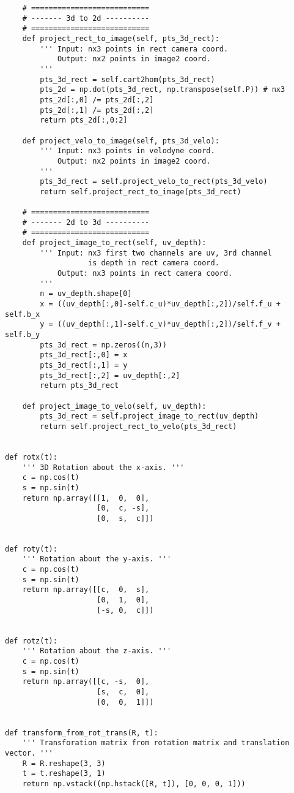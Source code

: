 \begin{verbatim}
    # =========================== 
    # ------- 3d to 2d ---------- 
    # =========================== 
    def project_rect_to_image(self, pts_3d_rect):
        ''' Input: nx3 points in rect camera coord.
            Output: nx2 points in image2 coord.
        '''
        pts_3d_rect = self.cart2hom(pts_3d_rect)
        pts_2d = np.dot(pts_3d_rect, np.transpose(self.P)) # nx3
        pts_2d[:,0] /= pts_2d[:,2]
        pts_2d[:,1] /= pts_2d[:,2]
        return pts_2d[:,0:2]
    
    def project_velo_to_image(self, pts_3d_velo):
        ''' Input: nx3 points in velodyne coord.
            Output: nx2 points in image2 coord.
        '''
        pts_3d_rect = self.project_velo_to_rect(pts_3d_velo)
        return self.project_rect_to_image(pts_3d_rect)

    # =========================== 
    # ------- 2d to 3d ---------- 
    # =========================== 
    def project_image_to_rect(self, uv_depth):
        ''' Input: nx3 first two channels are uv, 3rd channel
                   is depth in rect camera coord.
            Output: nx3 points in rect camera coord.
        '''
        n = uv_depth.shape[0]
        x = ((uv_depth[:,0]-self.c_u)*uv_depth[:,2])/self.f_u + self.b_x
        y = ((uv_depth[:,1]-self.c_v)*uv_depth[:,2])/self.f_v + self.b_y
        pts_3d_rect = np.zeros((n,3))
        pts_3d_rect[:,0] = x
        pts_3d_rect[:,1] = y
        pts_3d_rect[:,2] = uv_depth[:,2]
        return pts_3d_rect

    def project_image_to_velo(self, uv_depth):
        pts_3d_rect = self.project_image_to_rect(uv_depth)
        return self.project_rect_to_velo(pts_3d_rect)

 
def rotx(t):
    ''' 3D Rotation about the x-axis. '''
    c = np.cos(t)
    s = np.sin(t)
    return np.array([[1,  0,  0],
                     [0,  c, -s],
                     [0,  s,  c]])


def roty(t):
    ''' Rotation about the y-axis. '''
    c = np.cos(t)
    s = np.sin(t)
    return np.array([[c,  0,  s],
                     [0,  1,  0],
                     [-s, 0,  c]])


def rotz(t):
    ''' Rotation about the z-axis. '''
    c = np.cos(t)
    s = np.sin(t)
    return np.array([[c, -s,  0],
                     [s,  c,  0],
                     [0,  0,  1]])


def transform_from_rot_trans(R, t):
    ''' Transforation matrix from rotation matrix and translation vector. '''
    R = R.reshape(3, 3)
    t = t.reshape(3, 1)
    return np.vstack((np.hstack([R, t]), [0, 0, 0, 1]))



\end{verbatim}
